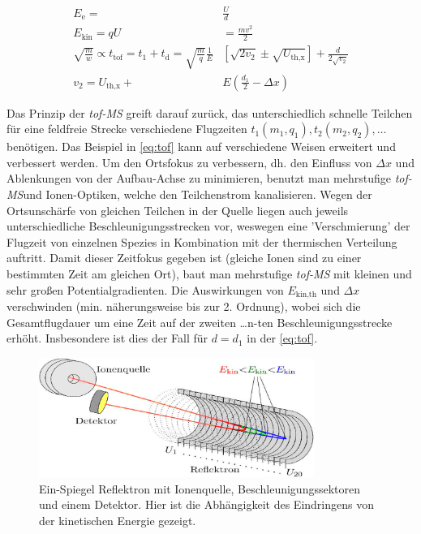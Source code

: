 \documentclass[numbers=noenddot,a4paper,notitlepage,twoside,BCOR15mm]{scrartcl}
\newcommand{\ix}[1]{_\text{#1}}
\newcommand{\tilt}[1]{\textit{#1}}
\begin{document}
			\begin{align}
				E\ix{e}=&\frac{U}{d} \label{eq:feld}\\
				E\ix{kin}=qU&=\frac{mv^2}{2} \label{eq:kinet}\\
				\sqrt{\frac{m}{w}}\propto t\ix{tof}=t\ix{1}+t\ix{d}=\sqrt{\frac{m}{q}}\frac{1}{E}&\left[\sqrt{2v\ix{2}}\pm\sqrt{U\ix{th,x}}\right]+\frac{d}{2\sqrt{v\ix{2}}} \label{eq:tof}\\
				v\ix{2}=U\ix{th,x}+&E\left(\frac{d\ix{1}}{2}-\Delta x\right)
			\end{align}

		Das Prinzip der \tilt{tof-MS} greift darauf zurück, das unterschiedlich schnelle Teilchen für eine feldfreie Strecke verschiedene Flugzeiten $t\ix{1}(m\ix{1},q\ix{1}),t\ix{2}(m\ix{2},q\ix{2}),\dots$ benötigen. Das Beispiel in \autoref{eq:tof} kann auf verschiedene Weisen erweitert und verbessert werden. Um den Ortsfokus zu verbessern, dh. den Einfluss von $\Delta x$ und Ablenkungen von der Aufbau-Achse zu minimieren, benutzt man mehrstufige \tilt{tof-MS}und Ionen-Optiken, welche den Teilchenstrom kanalisieren. Wegen der Ortsunschärfe von gleichen Teilchen in der Quelle liegen auch jeweils unterschiedliche Beschleunigungsstrecken vor, weswegen eine 'Verschmierung' der Flugzeit von einzelnen Spezies in Kombination mit der thermischen Verteilung auftritt. Damit dieser Zeitfokus gegeben ist (gleiche Ionen sind zu einer bestimmten Zeit am gleichen Ort), baut man mehrstufige \tilt{tof-MS} mit kleinen und sehr großen Potentialgradienten. Die Auswirkungen von $E\ix{kin,th}$ und $\Delta x$ verschwinden (min. näherungsweise bis zur 2. Ordnung), wobei sich die Gesamtflugdauer um eine Zeit auf der zweiten \dots n-ten Beschleunigungsstrecke erhöht. Insbesondere ist dies der Fall für $d=d\ix{1}$  in der \autoref{eq:tof}.

			\begin{figure}[t]
				\centering
				\includegraphics[width=0.8\textwidth]{einspiegel.png}
				\caption{Ein-Spiegel Reflektron mit Ionenquelle, Beschleunigungssektoren und einem Detektor. Hier ist die Abhängigkeit des Eindringens von der kinetischen Energie gezeigt. \cite{EMAUGreifswaldReflektron}}
				\label{img:reflektron1}
			\end{figure}
\end{document}
